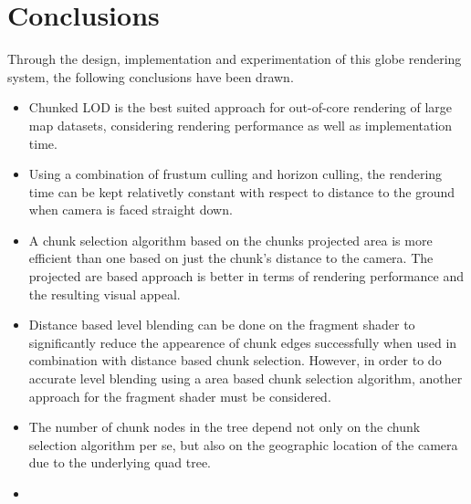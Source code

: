 \chapter{Conclusions}
Through the design, implementation and experimentation of this globe rendering system, the following conclusions have been drawn.
\begin{itemize}
	\item Chunked LOD is the best suited approach for out-of-core rendering of large map datasets, considering rendering performance as well as implementation time.
	\item Using a combination of frustum culling and horizon culling, the rendering time can be kept relativetly constant with respect to distance to the ground when camera is faced straight down.
	\item A chunk selection algorithm based on the chunks projected area is more efficient than one based on just the chunk's distance to the camera. The projected are based approach is better in terms of rendering performance and the resulting visual appeal.
	\item Distance based level blending can be done on the fragment shader to significantly reduce the appearence of chunk edges successfully when used in combination with distance based chunk selection. However, in order to do accurate level blending using a area based chunk selection algorithm, another approach for the fragment shader must be considered.
	\item The number of chunk nodes in the tree depend not only on the chunk selection algorithm per se, but also on the geographic location of the camera due to the underlying quad tree.
	\item 

\end{itemize}